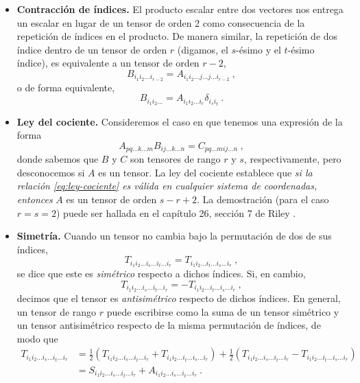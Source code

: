 \begin{itemize}
    \item \textbf{Contracción de índices.} El producto escalar entre dos vectores nos entrega un escalar en lugar de un tensor de orden 2 como consecuencia de la repetición de índices en el producto. De manera similar, la repetición de dos índice dentro de un tensor de orden $r$ (digamos, el $s$-ésimo y el $t$-ésimo índice), es equivalente a un tensor de orden $r-2$,
    \begin{equation}
        B_{i_1 i_2 \dots i_{r-2}} = A_{i_1 i_2 \dots j \dots j \dots i_{r-2}} \ ,
    \end{equation}
    o de forma equivalente,
    \begin{equation}
        B_{i_1 i_2 \dots} = A_{i_1 i_2 \dots i_r} \delta_{i_s i_t} \ .
    \end{equation}

    \item \textbf{Ley del cociente.} Consideremos el caso en que tenemos una expresión de la forma
    \begin{equation}\label{eq:ley-cociente}
        A_{pq \dots k \dots m} B_{ij \dots k \dots n} = C_{pq \dots m ij \dots n} \ ,
    \end{equation}
    donde sabemos que $B$ y $C$ son tensores de rango $r$ y $s$, respectivamente, pero desconocemos si $A$ es un tensor. La ley del cociente establece que \emph{si la relación \eqref{eq:ley-cociente} es válida en cualquier sistema de coordenadas, entonces} $A$ es un tensor de orden $s-r+2$. La demostración (para el caso $r=s=2$) puede ser hallada en el capítulo 26, sección 7 de Riley \cite{Riley}.
    
    \item \textbf{Simetría.} Cuando un tensor no cambia bajo la permutación de dos de sus índices, 
    \begin{equation}
        T_{i_1 i_2 \dots i_s \dots i_t \dots i_r} = T_{i_1 i_2 \dots i_t \dots i_s \dots i_r} \ , 
    \end{equation}
    se dice que este es \emph{simétrico} respecto a dichos índices. Si, en cambio,
    \begin{equation}
        T_{i_1 i_2 \dots i_s \dots i_t \dots i_r} = - T_{i_1 i_2 \dots i_t \dots i_s \dots i_r} \ ,
    \end{equation}
    decimos que el tensor es \emph{antisimétrico} respecto de dichos índices. En general, un tensor de rango $r$ puede escribirse como la suma de un tensor simétrico y un tensor antisimétrico respecto de la misma permutación de índices, de modo que
    \begin{align}
        T_{i_1 i_2 \dots i_s \dots i_t \dots i_r} & = \frac{1}{2} (T_{i_1 i_2 \dots i_s \dots i_t \dots i_r} + T_{i_1 i_2 \dots i_t \dots i_s \dots i_r}) + \frac{1}{2}(T_{i_1 i_2 \dots i_s \dots i_t \dots i_r} - T_{i_1 i_2 \dots i_t \dots i_s \dots i_r}) \\
        & = S_{i_1 i_2 \dots i_s \dots i_t \dots i_r} + A_{i_1 i_2 \dots i_s \dots i_t \dots i_r} \ .
    \end{align}


\end{itemize}
